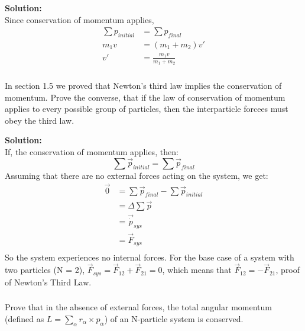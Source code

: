 \documentclass{article}
\newcommand\Problem{%
    \subsubsection{}%
}
\newcommand\TheSolution{%
  \textbf{Solution:}\\%
}
\begin{document}
\TheSolution Since conservation of momentum applies,
\begin{equation}
    \begin{aligned}
        \sum p_{initial} & = \sum p_{final}          \\
        m_1 v            & = (m_1 + m_2) v'          \\
        v'               & = \frac{m_1 v}{m_1 + m_2}
    \end{aligned}
\end{equation}

\Problem
In section 1.5 we proved that Newton's third law implies the conservation of momentum. Prove the converse, that if the law of conservation of momentum applies to every possible group of particles, then the interparticle forcees must obey the third law.

\TheSolution
If, the conservation of momentum applies, then:
\[\sum \vec{p}_{initial} = \sum \vec{p}_{final} \]
Assuming that there are no external forces acting on the system, we get:
\begin{equation}
    \begin{aligned}
        \vec{0} & = \sum \vec{p}_{final} - \sum \vec{p}_{initial} \\
                & = \Delta \sum \vec{p}                           \\
                & = \vec{\dot{p}}_{sys}                           \\
                & = \vec{F}_{sys}                                 \\
    \end{aligned}
\end{equation}
So the system experiences no internal forces. For the base case of a system with two particles (N = 2), $\vec{F}_{sys} = \vec{F}_{12} + \vec{F}_{21} = 0$, which means that $\vec{F}_{12} = -\vec{F}_{21}$, proof of Newton's Third Law.

\Problem Prove that in the absence of external forces, the total angular momentum (defined as $L = \sum_{\alpha} r_\alpha \times p_\alpha$) of an N-particle system is conserved.
\end{document}

